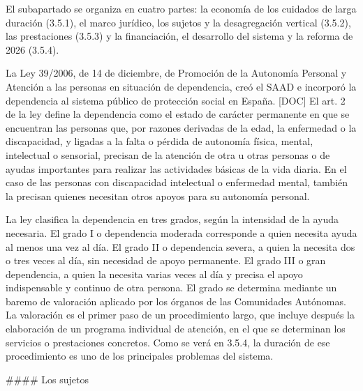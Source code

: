 \documentclass[10pt,a4paper]{article}
\begin{document}
El subapartado se organiza en cuatro partes: la economía de los cuidados de larga duración (3.5.1), el marco jurídico, los sujetos y la desagregación vertical (3.5.2), las prestaciones (3.5.3) y la financiación, el desarrollo del sistema y la reforma de 2026 (3.5.4).


La Ley 39/2006, de 14 de diciembre, de Promoción de la Autonomía Personal y Atención a las personas en situación de dependencia, creó el SAAD e incorporó la dependencia al sistema público de protección social en España. [DOC] El art. 2 de la ley define la dependencia como el estado de carácter permanente en que se encuentran las personas que, por razones derivadas de la edad, la enfermedad o la discapacidad, y ligadas a la falta o pérdida de autonomía física, mental, intelectual o sensorial, precisan de la atención de otra u otras personas o de ayudas importantes para realizar las actividades básicas de la vida diaria. En el caso de las personas con discapacidad intelectual o enfermedad mental, también la precisan quienes necesitan otros apoyos para su autonomía personal.

La ley clasifica la dependencia en tres grados, según la intensidad de la ayuda necesaria. El grado I o dependencia moderada corresponde a quien necesita ayuda al menos una vez al día. El grado II o dependencia severa, a quien la necesita dos o tres veces al día, sin necesidad de apoyo permanente. El grado III o gran dependencia, a quien la necesita varias veces al día y precisa el apoyo indispensable y continuo de otra persona. El grado se determina mediante un baremo de valoración aplicado por los órganos de las Comunidades Autónomas. La valoración es el primer paso de un procedimiento largo, que incluye después la elaboración de un programa individual de atención, en el que se determinan los servicios o prestaciones concretos. Como se verá en 3.5.4, la duración de ese procedimiento es uno de los principales problemas del sistema.

#### Los sujetos
\end{document}
